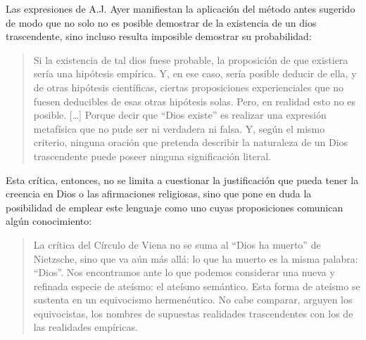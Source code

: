 Las expresiones de A.J. Ayer manifiestan la aplicación del método antes sugerido
de modo que no solo no es posible demostrar de la existencia de un dios
trascendente, sino incluso resulta imposible demostrar su probabilidad:
\blockquote[{\cite[155]{dominguez2009at}}]{Si la existencia de tal dios fuese
  probable, la proposición de que existiera sería una hipótesis empírica. Y, en
  ese caso, sería posible deducir de ella, y de otras hipótesis científicas,
  ciertas proposiciones experienciales que no fuesen deducibles de esas otras
  hipótesis solas. Pero, en realidad esto no es posible. [\ldots] Porque decir
  que ``Dios existe'' es realizar una expresión metafísica que no pude ser ni
  verdadera ni falsa. Y, según el mismo criterio, ninguna oración que pretenda
  describir la naturaleza de un Dios trascendente puede poseer ninguna
  significación literal.} Esta crítica, entonces, no se limita a cuestionar la
justificación que pueda tener la creencia en Dios o las afirmaciones religiosas,
sino que pone en duda la posibilidad de emplear este lenguaje como uno cuyas
proposiciones comunican algún conocimiento:
\blockquote[{\cite[155]{dominguez2009at}}]{La crítica del Círculo de Viena no se
  suma al ``Dios ha muerto'' de Nietzsche, sino que va aún más allá: lo que ha
  muerto es la misma palabra: ``Dios''. Nos encontramos ante lo que podemos
  considerar una nueva y refinada especie de ateísmo: el ateísmo semántico. Esta
  forma de ateísmo se sustenta en un equivocismo hermenéutico. No cabe comparar,
  arguyen los equivocistas, los nombres de supuestas realidades trascendentes
  con los de las realidades empíricas.}

